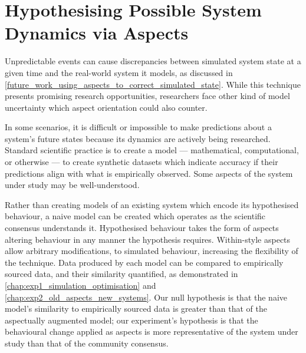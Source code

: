 


\section{Hypothesising Possible System Dynamics via Aspects}
\label{future_work_hypothesising_system_states}


Unpredictable events can cause discrepancies between simulated system state at a
given time and the real-world system it models, as discussed in
\cref{future_work_using_aspects_to_correct_simulated_state}. While this
technique presents promising research opportunities, researchers face other kind
of model uncertainty which aspect orientation could also counter.

In some scenarios, it is difficult or impossible to make predictions about a
system's future states because its dynamics are actively being researched.
Standard scientific practice is to create a model --- mathematical,
computational, or otherwise --- to create synthetic datasets which indicate
accuracy if their predictions align with what is empirically observed.
 Some aspects of the system under study may be
well-understood.

Rather than creating models of an existing system which encode its hypothesised
behaviour, a naive model can be created which operates as the scientific
consensus understands it. Hypothesised behaviour takes the form of aspects
altering behaviour in any manner the hypothesis requires. Within-style aspects
allow arbitrary modifications, to simulated behaviour, increasing the
flexibility of the technique. Data produced by each model can be compared to
empirically sourced data, and their similarity quantified, as demonstrated in
\cref{chap:exp1_simulation_optimisation} and
\cref{chap:exp2_old_aspects_new_systems}. Our null hypothesis is that the naive
model's similarity to empirically sourced data is greater than that of the
aspectually augmented model; our experiment's hypothesis is that the behavioural
change applied as aspects is more representative of the system under study than
that of the community consensus.

